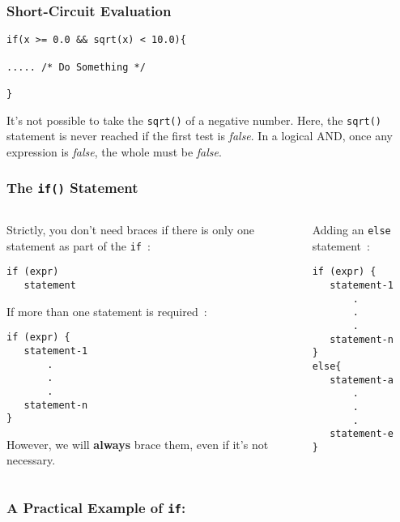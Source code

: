 \begin{frame}[fragile]
\frametitle{Short-Circuit Evaluation}

\begin{lstlisting}[style=basicc,numbers=none]
if(x >= 0.0 && sqrt(x) < 10.0){

..... /* Do Something */

}
\end{lstlisting}

It's not possible to take the \verb^sqrt()^ of a negative number.
Here, the \verb^sqrt()^ statement is never reached if the first test is {\it false}.
In a logical AND, once any expression is {\it false}, the whole must
be {\it false}.
\end{frame}


\begin{frame}[fragile]
\frametitle{The {\tt if()} Statement}

\begin{columns}

\begin{column}{0.45\textwidth}
Strictly, you don't need braces if there is only one statement as part of the {\tt if}~:
\begin{lstlisting}[style=basicc,numbers=none]
if (expr)
   statement
\end{lstlisting}

If more than one statement is required~:
\begin{lstlisting}[style=basicc,numbers=none]
if (expr) {
   statement-1
       .
       .
       .
   statement-n
}
\end{lstlisting}
However, we will {\bf always} brace them, even if it's not necessary.
\end{column}

\pause
\begin{column}{0.45\textwidth}
Adding an \verb^else^ statement~:

\begin{lstlisting}[style=basicc,numbers=none]
if (expr) {
   statement-1
       .
       .
       .
   statement-n
}
else{
   statement-a
       .
       .
       .
   statement-e
}
\end{lstlisting}
\end{column}

\end{columns}
\end{frame}

\begin{frame}[fragile]
\frametitle{A Practical Example of {\tt if}:}
\begin{columns}

\begin{column}{0.5\textwidth}

\end{column}

\begin{column}{0.40\textwidth}
\end{column}

\end{columns}
\end{frame}

